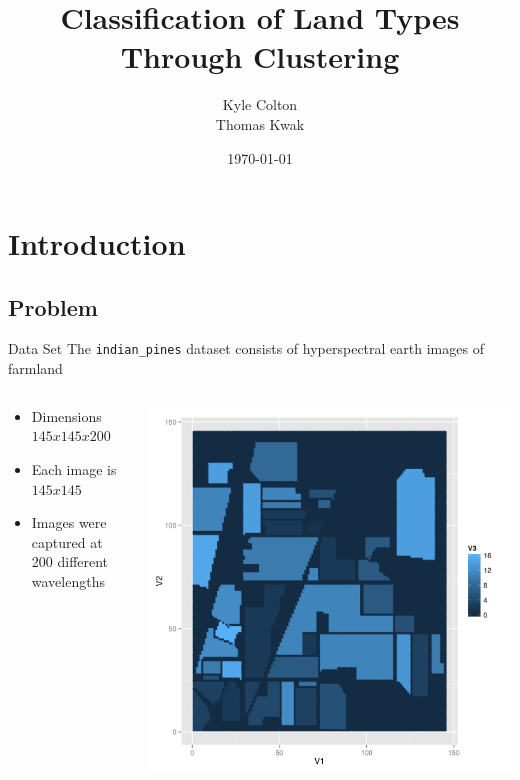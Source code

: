 \documentclass[11pt]{beamer}
\author{Kyle Colton\\Thomas Kwak}
\title{Classification of Land Types Through Clustering}
\institute{Math 191}
\date{\today}
\begin{document}
\begin{frame}
\titlepage
\end{frame}

\section{Introduction}
\subsection{Problem}
\begin{frame}{Data Set}
The \texttt{indian\_pines} dataset consists of hyperspectral earth images of farmland
\begin{columns}[T]
\begin{column}{.48\textwidth}
\begin{itemize}
\item Dimensions $145 x 145 x 200$
\item Each image is $145x145$
\item Images were captured at 200 different wavelengths
\end{itemize}
\end{column}
\hfill
\begin{column}{.48\textwidth}
\includegraphics[scale=.3]{gt.png}
\end{column}
\end{columns}
\end{frame}
\end{document}
